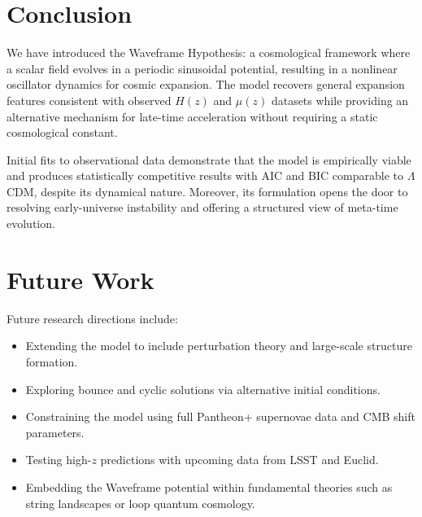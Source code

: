 \documentclass[12pt]{article}
\begin{document}
\section*{Conclusion}

We have introduced the Waveframe Hypothesis: a cosmological framework where a scalar field evolves in a periodic sinusoidal potential, resulting in a nonlinear oscillator dynamics for cosmic expansion. The model recovers general expansion features consistent with observed $H(z)$ and $\mu(z)$ datasets while providing an alternative mechanism for late-time acceleration without requiring a static cosmological constant.

Initial fits to observational data demonstrate that the model is empirically viable and produces statistically competitive results with AIC and BIC comparable to $\Lambda$CDM, despite its dynamical nature. Moreover, its formulation opens the door to resolving early-universe instability and offering a structured view of meta-time evolution.

\section*{Future Work}

Future research directions include:
\begin{itemize}
  \item Extending the model to include perturbation theory and large-scale structure formation.
  \item Exploring bounce and cyclic solutions via alternative initial conditions.
  \item Constraining the model using full Pantheon+ supernovae data and CMB shift parameters.
  \item Testing high-$z$ predictions with upcoming data from LSST and Euclid.
  \item Embedding the Waveframe potential within fundamental theories such as string landscapes or loop quantum cosmology.
\end{itemize}
\end{document}
